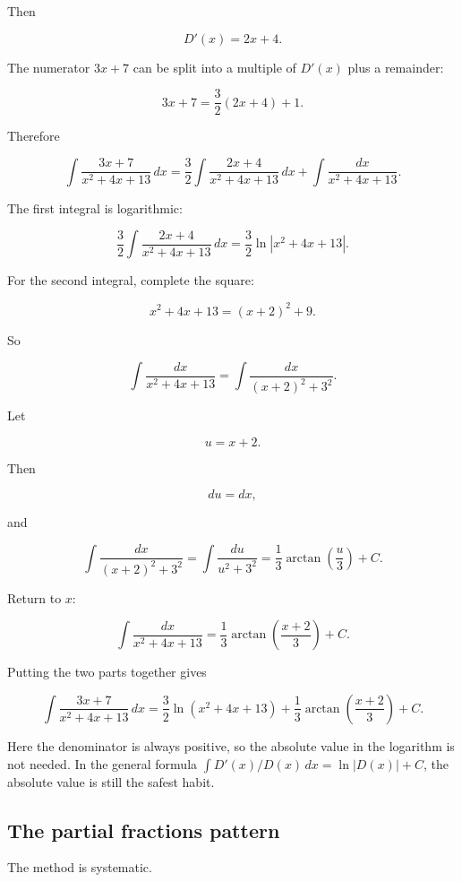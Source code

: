 Then

\[
D'(x)=2x+4.
\]

The numerator \(3x+7\) can be split into a multiple of \(D'(x)\) plus a remainder:

\[
3x+7
=
\frac32(2x+4)+1.
\]

Therefore

\[
\int \frac{3x+7}{x^2+4x+13}\,dx
=
\frac32\int \frac{2x+4}{x^2+4x+13}\,dx
+
\int \frac{dx}{x^2+4x+13}.
\]

The first integral is logarithmic:

\[
\frac32\int \frac{2x+4}{x^2+4x+13}\,dx
=
\frac32\ln|x^2+4x+13|.
\]

For the second integral, complete the square:

\[
x^2+4x+13=(x+2)^2+9.
\]

So

\[
\int \frac{dx}{x^2+4x+13}
=
\int\frac{dx}{(x+2)^2+3^2}.
\]

Let

\[
u=x+2.
\]

Then

\[
du=dx,
\]

and

\[
\int\frac{dx}{(x+2)^2+3^2}
=
\int\frac{du}{u^2+3^2}
=
\frac13\arctan\left(\frac{u}{3}\right)+C.
\]

Return to \(x\):

\[
\int \frac{dx}{x^2+4x+13}
=
\frac13\arctan\left(\frac{x+2}{3}\right)+C.
\]

Putting the two parts together gives

\[
\boxed{
\int \frac{3x+7}{x^2+4x+13}\,dx
=
\frac32\ln(x^2+4x+13)
+
\frac13\arctan\left(\frac{x+2}{3}\right)
+C.
}
\]

Here the denominator is always positive, so the absolute value in the logarithm is not
needed.  In the general formula \(\int D'(x)/D(x)\,dx=\ln|D(x)|+C\), the absolute value
is still the safest habit.

\subsection{The partial fractions pattern}
\label{subsec:partial-fractions-pattern}

The method is systematic.

